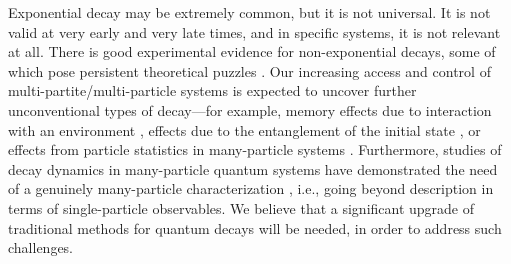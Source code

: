 \documentclass[12pt]{article}
\numberwithin{equation}{section}
\begin{document}
Exponential decay may be extremely common, but it is not universal. It is not valid at very early and very late times, and in specific systems, it is not relevant at all. There is good experimental evidence for non-exponential decays, some of which pose persistent theoretical puzzles \cite{GSI}. Our increasing access and control of multi-partite/multi-particle systems is expected to uncover further unconventional types of decay---for example,  memory effects due to interaction with an environment \cite{nonMark, BKEC},  effects due to the entanglement of the initial state \cite{AnHu2, CVS17, C18}, or effects from particle statistics in many-particle systems \cite{ADCM, TS11, CL11, DC11, MG11}. Furthermore, studies of    decay dynamics in many-particle quantum systems have demonstrated the need of  a genuinely many-particle characterization \cite{ PSC12, HZHB13, DC16}, i.e., going beyond
description in terms of single-particle observables.  We believe that a significant upgrade of traditional methods for quantum decays will be needed, in order to address such challenges.
\end{document}

